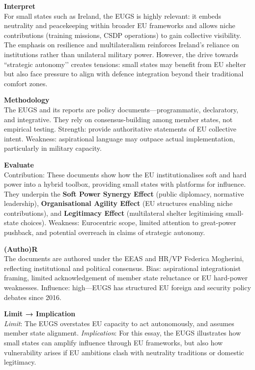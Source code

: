 \textbf{Interpret} \\  
For small states such as Ireland, the EUGS is highly relevant: it embeds neutrality and peacekeeping within broader EU frameworks and allows niche contributions (training missions, CSDP operations) to gain collective visibility. The emphasis on resilience and multilateralism reinforces Ireland’s reliance on institutions rather than unilateral military power. However, the drive towards ``strategic autonomy’’ creates tensions: small states may benefit from EU shelter but also face pressure to align with defence integration beyond their traditional comfort zones.  

\textbf{Methodology} \\  
The EUGS and its reports are policy documents—programmatic, declaratory, and integrative. They rely on consensus-building among member states, not empirical testing. Strength: provide authoritative statements of EU collective intent. Weakness: aspirational language may outpace actual implementation, particularly in military capacity.  

\textbf{Evaluate} \\  
Contribution: These documents show how the EU institutionalises soft and hard power into a hybrid toolbox, providing small states with platforms for influence. They underpin the \textbf{Soft Power Synergy Effect} (public diplomacy, normative leadership), \textbf{Organisational Agility Effect} (EU structures enabling niche contributions), and \textbf{Legitimacy Effect} (multilateral shelter legitimising small-state choices). Weakness: Eurocentric scope, limited attention to great-power pushback, and potential overreach in claims of strategic autonomy.  

\textbf{(Autho)R} \\  
The documents are authored under the EEAS and HR/VP Federica Mogherini, reflecting institutional and political consensus. Bias: aspirational integrationist framing, limited acknowledgement of member state reluctance or EU hard-power weaknesses. Influence: high—EUGS has structured EU foreign and security policy debates since 2016.  

\textbf{Limit → Implication} \\  
\textit{Limit}: The EUGS overstates EU capacity to act autonomously, and assumes member state alignment.  
\textit{Implication}: For this essay, the EUGS illustrates how small states can amplify influence through EU frameworks, but also how vulnerability arises if EU ambitions clash with neutrality traditions or domestic legitimacy.  

